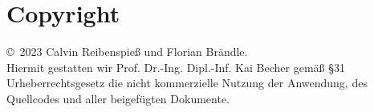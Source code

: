 
\chapter{Copyright}

\copyright \, 2023 Calvin Reibenspieß und Florian Brändle.\\
Hiermit gestatten wir Prof. Dr.-Ing. Dipl.-Inf. Kai Becher gemäß \S 31 Urheberrechtsgesetz die nicht kommerzielle Nutzung der Anwendung, des Quellcodes und aller beigefügten Dokumente.